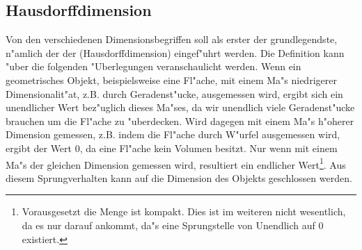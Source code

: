 \subsection{Hausdorffdimension}
Von den verschiedenen Dimensionsbegriffen soll als erster der grundlegendste, n"amlich der
der \begriff(Hausdorffdimension) eingef"uhrt werden. Die Definition kann "uber die
folgenden "Uberlegungen veranschaulicht werden. Wenn ein geometrisches Objekt,
beispielsweise eine Fl"ache, mit einem Ma"s niedrigerer Dimensionalit"at, z.B. durch
Geradenst"ucke, ausgemessen wird, ergibt sich ein unendlicher Wert bez"uglich dieses
Ma"ses, da wir unendlich viele Geradenst"ucke brauchen um die Fl"ache zu "uberdecken. Wird
dagegen mit einem Ma"s h"oherer Dimension gemessen, z.B. indem die Fl"ache durch W"urfel
ausgemessen wird, ergibt der Wert 0, da eine Fl"ache kein Volumen besitzt. Nur wenn mit
einem Ma"s der gleichen Dimension gemessen wird, resultiert ein endlicher
Wert\footnote{Vorausgesetzt die Menge ist kompakt. Dies ist im weiteren nicht wesentlich,
  da es nur darauf ankommt, da"s eine Sprungstelle von Unendlich auf 0 existiert.}. Aus
diesem Sprungverhalten kann auf die Dimension des Objekts geschlossen werden.

